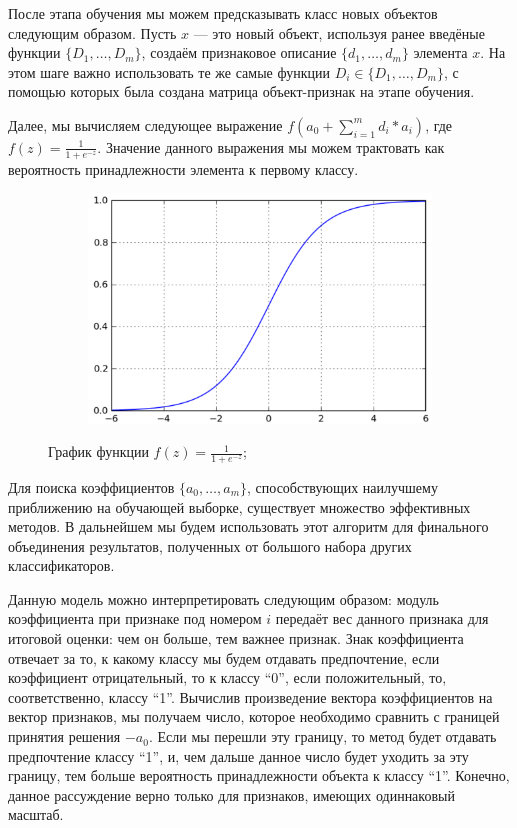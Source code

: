 После этапа обучения мы можем предсказывать класс новых объектов следующим образом. Пусть $x$ — это новый объект, используя ранее введёные функции $\{D_1, \dots, D_m \}$, создаём признаковое описание $\{d_1,…,d_m\}$ элемента $x$. На этом шаге важно использовать те же самые функции $D_i \in \{D_1, \dots, D_m \}$, с помощью которых была создана матрица объект-признак на этапе обучения.

Далее, мы вычисляем следующее выражение $ f \left( a_0 + \sum_{i=1}^{m} d_i * a_i \right)$, где $f \left( z \right) = \frac{1}{1 + e^{-z}}$. Значение данного выражения мы можем трактовать как вероятность принадлежности элемента к первому классу.

\begin{figure}[ht]
	\centering
    \begin{subfigure}[b]{1\textwidth}
    \centering
        \includegraphics[scale=0.5]{pasted-image-15.png}
    \end{subfigure}
 
    \caption{График функции $f \left( z \right) = \frac{1}{1 + e^{-z}}$;}
    \label{fig_parsetree}
\end{figure}

Для поиска коэффициентов $\{a_0,…,a_m\}$, способствующих наилучшему приближению на обучающей выборке, существует множество эффективных методов. В дальнейшем мы будем использовать этот алгоритм для финального объединения результатов, полученных от большого набора других классификаторов. 

Данную модель можно интерпретировать следующим образом: модуль коэффициента при признаке под номером $i$ передаёт вес данного признака для итоговой оценки: чем он больше, тем важнее признак. Знак коэффициента отвечает за то, к какому классу мы будем отдавать предпочтение, если коэффициент отрицательный, то к классу “0”, если положительный, то, соответственно, классу “1”. Вычислив произведение вектора коэффициентов на вектор признаков, мы получаем число, которое необходимо сравнить с границей принятия решения $-a_0$. Если мы перешли эту границу, то метод будет отдавать предпочтение классу “1”, и, чем дальше данное число будет уходить за эту границу, тем больше вероятность принадлежности объекта к классу “1”. Конечно, данное рассуждение верно только для признаков, имеющих одиннаковый масштаб.

